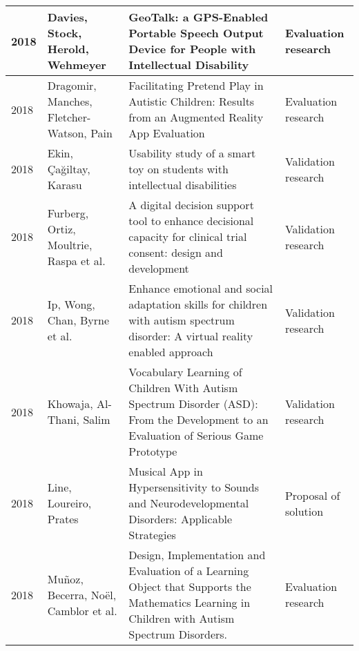 \documentclass[utf8,english]{gradu3}
\begin{document}
\begin{longtable}{|>{\scriptsize}l|>{\scriptsize}p{3cm}|>{\scriptsize}p{8cm}|>{\scriptsize}p{2.4cm}|}
  2018          & Davies, Stock, Herold, Wehmeyer                                      & GeoTalk: a GPS-Enabled Portable Speech Output Device for People with Intellectual Disability                                                                                                 & Evaluation research        \\ \hline
  2018          & Dragomir, Manches, Fletcher-Watson, Pain                             & Facilitating Pretend Play in Autistic Children: Results from an Augmented Reality App Evaluation                                                                                             & Evaluation research        \\ \hline
  2018          & Ekin, Çağiltay, Karasu                                               & Usability study of a smart toy on students with intellectual disabilities                                                                                                                    & Validation research        \\ \hline
  2018          & Furberg, Ortiz, Moultrie, Raspa et al.                               & A digital decision support tool to enhance decisional capacity for clinical trial consent: design and development                                                                            & Validation research        \\ \hline
  2018          & Ip, Wong, Chan, Byrne et al.                                         & Enhance emotional and social adaptation skills for children with autism spectrum disorder: A virtual reality enabled approach                                                                & Validation research        \\ \hline
  2018          & Khowaja, Al-Thani, Salim                                             & Vocabulary Learning of Children With Autism Spectrum Disorder (ASD): From the Development to an Evaluation of Serious Game Prototype                                                         & Validation research        \\ \hline
  2018          & Line, Loureiro, Prates                                               & Musical App in Hypersensitivity to Sounds and Neurodevelopmental Disorders: Applicable Strategies                                                                                            & Proposal of solution       \\ \hline
  2018          & Muñoz, Becerra, Noël, Camblor et al.                                 & Design, Implementation and Evaluation of a Learning Object that Supports the Mathematics Learning in Children with Autism Spectrum Disorders.                                                & Evaluation research        \\ \hline

\end{longtable}
\end{document}
